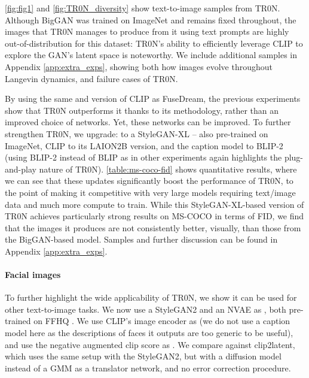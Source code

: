 \documentclass[nohyperref]{article}
\theoremstyle{plain}
\theoremstyle{definition}
\theoremstyle{remark}
\begin{document}
\begin{figure*} [h!]
\begin{tabular}
\autoref{fig:fig1} and \autoref{fig:TR0N_diversity} show text-to-image samples from TR0N. Although BigGAN was trained on ImageNet and remains fixed throughout, the images that TR0N manages to produce from it using text prompts are highly out-of-distribution for this dataset: TR0N's ability to efficiently leverage CLIP to explore the GAN's latent space  is noteworthy. We include additional samples in Appendix \ref{app:extra_exps}, showing both how images evolve throughout Langevin dynamics, and failure cases of TR0N.

By using the same  and version of CLIP as FuseDream, the previous experiments show that TR0N outperforms it thanks to its methodology, rather than an improved choice of networks.
Yet, these networks can be improved. To further strengthen TR0N,  we upgrade:  to a StyleGAN-XL \citep{sauer2022stylegan} -- also pre-trained on ImageNet, CLIP to its LAION2B \citep{schuhmann2022laionb} version, and the caption model to BLIP-2 \citep{li2023blip} (using BLIP-2 instead of BLIP as in other experiments again highlights the plug-and-play nature of TR0N). \autoref{table:ms-coco-fid} shows quantitative results, where we can see that these updates significantly boost the performance of TR0N, to the point of making it competitive with very large models requiring text/image data and much more compute to train. While this StyleGAN-XL-based version of TR0N achieves particularly strong results on MS-COCO in terms of FID, we find that the images it produces are not consistently better, visually, than those from the BigGAN-based model. Samples and further discussion can be found in Appendix \ref{app:extra_exps}.


\paragraph{Facial images} To further highlight the wide applicability of TR0N, we show it can be used for other text-to-image tasks. We now use a StyleGAN2 \citep{Karras2019stylegan2} and an NVAE as , both pre-trained on FFHQ \citep{karras2019style}. We use CLIP's image encoder  as  (we do not use a caption model here as the descriptions of faces it outputs are too generic to be useful), and use the negative augmented clip score  as . We compare against clip2latent, which uses the same setup with the StyleGAN2, but with a diffusion model instead of a GMM as a translator network, and no error correction procedure.


\end{tabular}
\end{figure*}
\end{document}
